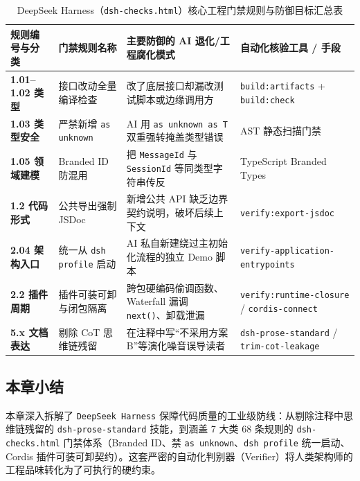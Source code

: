 \documentclass[a4paper]{article}
\begin{document}
\begin{table}[H]
\centering
\small
\caption{DeepSeek Harness（\texttt{dsh-checks.html}）核心工程门禁规则与防御目标汇总表}
\begin{tabular}{p{2.1cm}p{2.9cm}p{4.0cm}p{4.2cm}}
\toprule
\textbf{规则编号与分类} & \textbf{门禁规则名称} & \textbf{主要防御的 AI 退化/工程腐化模式} & \textbf{自动化核验工具 / 手段} \\
\midrule
\textbf{1.01--1.02 类型} & 接口改动全量编译检查 & 改了底层接口却漏改测试脚本或边缘调用方 & \texttt{build:artifacts} + \texttt{build:check} \\
\textbf{1.03 类型安全} & 严禁新增 \texttt{as unknown} & AI 用 \texttt{as unknown as T} 双重强转掩盖类型错误 & AST 静态扫描门禁 \\
\textbf{1.05 领域建模} & Branded ID 防混用 & 把 \texttt{MessageId} 与 \texttt{SessionId} 等同类型字符串传反 & TypeScript Branded Types \\
\textbf{1.2 代码形式} & 公共导出强制 JSDoc & 新增公共 API 缺乏边界契约说明，破坏后续上下文 & \texttt{verify:export-jsdoc} \\
\textbf{2.04 架构入口} & 统一从 \texttt{dsh profile} 启动 & AI 私自新建绕过主初始化流程的独立 Demo 脚本 & {\footnotesize\texttt{verify-application-entrypoints}} \\
\textbf{2.2 插件周期} & 插件可装可卸与闭包隔离 & 跨包硬编码偷调函数、Waterfall 漏调 \texttt{next()}、卸载泄漏 & {\footnotesize\texttt{verify:runtime-closure} / \texttt{cordis-connect}} \\
\textbf{5.x 文档表达} & 剔除 CoT 思维链残留 & 在注释中写“不采用方案 B”等演化噪音误导读者 & \texttt{dsh-prose-standard} / \texttt{trim-cot-leakage} \\
\bottomrule
\end{tabular}
\end{table}

\subsection{本章小结}

本章深入拆解了 \texttt{DeepSeek Harness} 保障代码质量的工业级防线：从剔除注释中思维链残留的 \texttt{dsh-prose-standard} 技能，到涵盖 7 大类 68 条规则的 \texttt{dsh-checks.html} 门禁体系（Branded ID、禁 \texttt{as unknown}、\texttt{dsh profile} 统一启动、Cordis 插件可装可卸契约）。这套严密的自动化判别器（Verifier）将人类架构师的工程品味转化为了可执行的硬约束。

\end{document}
